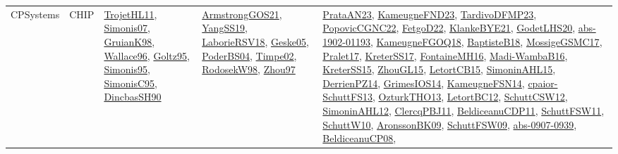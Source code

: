 {\begin{longtable}{lp{3cm}>{\raggedright}p{6cm}>{\raggedright}p{6cm}p{8cm}}
CPSystems & CHIP & \href{articles/TrojetHL11.pdf}{TrojetHL11}\cite{TrojetHL11}, \href{articles/Simonis07.pdf}{Simonis07}\cite{Simonis07}, \href{papers/GruianK98.pdf}{GruianK98}\cite{GruianK98}, \href{articles/Wallace96.pdf}{Wallace96}\cite{Wallace96}, \href{papers/Goltz95.pdf}{Goltz95}\cite{Goltz95}, \href{papers/Simonis95.pdf}{Simonis95}\cite{Simonis95}, \href{papers/SimonisC95.pdf}{SimonisC95}\cite{SimonisC95}, \href{articles/DincbasSH90.pdf}{DincbasSH90}\cite{DincbasSH90} & \href{papers/ArmstrongGOS21.pdf}{ArmstrongGOS21}\cite{ArmstrongGOS21}, \href{papers/YangSS19.pdf}{YangSS19}\cite{YangSS19}, \href{articles/LaborieRSV18.pdf}{LaborieRSV18}\cite{LaborieRSV18}, \href{papers/Geske05.pdf}{Geske05}\cite{Geske05}, \href{articles/PoderBS04.pdf}{PoderBS04}\cite{PoderBS04}, \href{articles/Timpe02.pdf}{Timpe02}\cite{Timpe02}, \href{papers/RodosekW98.pdf}{RodosekW98}\cite{RodosekW98}, \href{articles/Zhou97.pdf}{Zhou97}\cite{Zhou97} & \href{articles/PrataAN23.pdf}{PrataAN23}\cite{PrataAN23}, \href{papers/KameugneFND23.pdf}{KameugneFND23}\cite{KameugneFND23}, \href{papers/TardivoDFMP23.pdf}{TardivoDFMP23}\cite{TardivoDFMP23}, \href{papers/PopovicCGNC22.pdf}{PopovicCGNC22}\cite{PopovicCGNC22}, \href{articles/FetgoD22.pdf}{FetgoD22}\cite{FetgoD22}, \href{papers/KlankeBYE21.pdf}{KlankeBYE21}\cite{KlankeBYE21}, \href{papers/GodetLHS20.pdf}{GodetLHS20}\cite{GodetLHS20}, \href{articles/abs-1902-01193.pdf}{abs-1902-01193}\cite{abs-1902-01193}, \href{papers/KameugneFGOQ18.pdf}{KameugneFGOQ18}\cite{KameugneFGOQ18}, \href{articles/BaptisteB18.pdf}{BaptisteB18}\cite{BaptisteB18}, \href{papers/MossigeGSMC17.pdf}{MossigeGSMC17}\cite{MossigeGSMC17}, \href{papers/Pralet17.pdf}{Pralet17}\cite{Pralet17}, \href{articles/KreterSS17.pdf}{KreterSS17}\cite{KreterSS17}, \href{papers/FontaineMH16.pdf}{FontaineMH16}\cite{FontaineMH16}, \href{papers/Madi-WambaB16.pdf}{Madi-WambaB16}\cite{Madi-WambaB16}, \href{papers/KreterSS15.pdf}{KreterSS15}\cite{KreterSS15}, \href{papers/ZhouGL15.pdf}{ZhouGL15}\cite{ZhouGL15}, \href{articles/LetortCB15.pdf}{LetortCB15}\cite{LetortCB15}, \href{articles/SimoninAHL15.pdf}{SimoninAHL15}\cite{SimoninAHL15}, \href{papers/DerrienPZ14.pdf}{DerrienPZ14}\cite{DerrienPZ14}, \href{articles/GrimesIOS14.pdf}{GrimesIOS14}\cite{GrimesIOS14}, \href{articles/KameugneFSN14.pdf}{KameugneFSN14}\cite{KameugneFSN14}, \href{papers/cpaior-SchuttFS13.pdf}{cpaior-SchuttFS13}\cite{cpaior-SchuttFS13}, \href{articles/OzturkTHO13.pdf}{OzturkTHO13}\cite{OzturkTHO13}, \href{papers/LetortBC12.pdf}{LetortBC12}\cite{LetortBC12}, \href{papers/SchuttCSW12.pdf}{SchuttCSW12}\cite{SchuttCSW12}, \href{papers/SimoninAHL12.pdf}{SimoninAHL12}\cite{SimoninAHL12}, \href{papers/ClercqPBJ11.pdf}{ClercqPBJ11}\cite{ClercqPBJ11}, \href{articles/BeldiceanuCDP11.pdf}{BeldiceanuCDP11}\cite{BeldiceanuCDP11}, \href{articles/SchuttFSW11.pdf}{SchuttFSW11}\cite{SchuttFSW11}, \href{papers/SchuttW10.pdf}{SchuttW10}\cite{SchuttW10}, \href{papers/AronssonBK09.pdf}{AronssonBK09}\cite{AronssonBK09}, \href{papers/SchuttFSW09.pdf}{SchuttFSW09}\cite{SchuttFSW09}, \href{articles/abs-0907-0939.pdf}{abs-0907-0939}\cite{abs-0907-0939}, \href{papers/BeldiceanuCP08.pdf}{BeldiceanuCP08}\cite{BeldiceanuCP08}, 
\end{longtable}}
